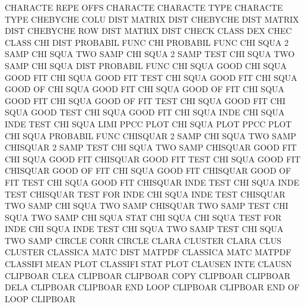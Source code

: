CHARACTE REPE OFFS                      CHARACTE
CHARACTE TYPE                           CHARACTE TYPE
CHEBYCHE COLU DIST                      MATRIX   DIST
CHEBYCHE DIST                           MATRIX   DIST
CHEBYCHE ROW  DIST                      MATRIX   DIST
CHECK    CLASS                          DEX      CHEC CLASS
CHI      DIST                           PROBABIL FUNC
CHI                                     PROBABIL FUNC
CHI      SQUA 2    SAMP                 CHI      SQUA TWO  SAMP
CHI      SQUA 2    SAMP TEST            CHI      SQUA TWO  SAMP
CHI      SQUA DIST                      PROBABIL FUNC
CHI      SQUA GOOD                      CHI      SQUA GOOD FIT
CHI      SQUA GOOD FIT  TEST            CHI      SQUA GOOD FIT
CHI      SQUA GOOD OF                   CHI      SQUA GOOD FIT
CHI      SQUA GOOD OF   FIT             CHI      SQUA GOOD FIT
CHI      SQUA GOOD OF   FIT  TEST       CHI      SQUA GOOD FIT
CHI      SQUA GOOD TEST                 CHI      SQUA GOOD FIT
CHI      SQUA INDE                      CHI      SQUA INDE TEST
CHI      SQUA LIMI                      PPCC     PLOT
CHI      SQUA PLOT                      PPCC     PLOT
CHI      SQUA                           PROBABIL FUNC
CHISQUAR 2    SAMP                      CHI      SQUA TWO  SAMP
CHISQUAR 2    SAMP TEST                 CHI      SQUA TWO  SAMP
CHISQUAR GOOD FIT                       CHI      SQUA GOOD FIT
CHISQUAR GOOD FIT  TEST                 CHI      SQUA GOOD FIT
CHISQUAR GOOD OF   FIT                  CHI      SQUA GOOD FIT
CHISQUAR GOOD OF   FIT  TEST            CHI      SQUA GOOD FIT
CHISQUAR INDE TEST                      CHI      SQUA INDE TEST
CHISQUAR TEST FOR  INDE                 CHI      SQUA INDE TEST
CHISQUAR TWO  SAMP                      CHI      SQUA TWO  SAMP
CHISQUAR TWO  SAMP TEST                 CHI      SQUA TWO  SAMP
CHI      SQUA STAT                      CHI      SQUA
CHI      SQUA TEST FOR  INDE            CHI      SQUA INDE TEST
CHI      SQUA TWO  SAMP TEST            CHI      SQUA TWO  SAMP
CIRCLE   CORR                           CIRCLE
CLARA                                   CLUSTER
CLARA    CLUS                           CLUSTER
CLASSICA MATC DIST                      MATPDF
CLASSICA MATC                           MATPDF
CLASSIFI MEAN PLOT                      CLASSIFI STAT PLOT
CLAUSEN  INTE                           CLAUSN
CLIPBOAR CLEA                           CLIPBOAR
CLIPBOAR COPY                           CLIPBOAR
CLIPBOAR DELA                           CLIPBOAR
CLIPBOAR END  LOOP                      CLIPBOAR
CLIPBOAR END  OF   LOOP                 CLIPBOAR
